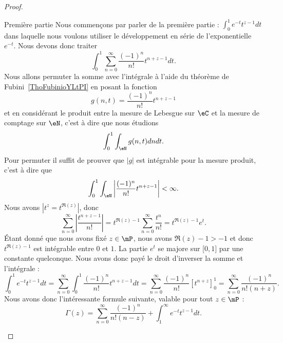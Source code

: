 \begin{proof}
\begin{subproof}
        \item[Première partie] Nous commençons par parler de la première partie : \( \int_0^1 e^{-t}t^{z-1}dt\) dans laquelle nous voulons utiliser le développement en série de l'exponentielle \(  e^{-t}\). Nous devons donc traiter
            \begin{equation}
                \int_0^1\sum_{n=0}^{\infty}\frac{ (-1)^n }{ n! }t^{n+z-1}dt.
            \end{equation}
            Nous allons permuter la somme avec l'intégrale à l'aide du théorème de Fubini~\ref{ThoFubinioYLtPI} en posant la fonction
            \begin{equation}
                g(n,t)=\frac{ (-1)^n }{ n! }t^{n+z-1}
            \end{equation}
            et en considérant le produit entre la mesure de Lebesgue sur \( \eC\) et la mesure de comptage sur \( \eN\), c'est à dire que nous étudions
            \begin{equation}
                \int_0^1\int_{\eN}g(n,t)dndt.
            \end{equation}
            Pour permuter il suffit de prouver que \( | g |\) est intégrable pour la mesure produit, c'est à dire que
            \begin{equation}
                \int_0^1\int_{\eN}\left| \frac{ (-1)^n }{ n! }t^{n+z-1} \right| <\infty.
            \end{equation}
            Nous avons \( | t^z=t^{\Re(z)} |\), donc
            \begin{equation}
                \sum_{n=0}^{\infty}\left| \frac{ t^{n+z-1} }{ n! } \right| =t^{\Re(z)-1}\sum_{n=0}^{\infty}\frac{ t^n }{ n! }=t^{\Re(z)-1} e^{t}.
            \end{equation}
            Étant donné que nous avons fixé \( z\in\mP\), nous avons \( \Re(z)-1>-1\) et donc \( t^{\Re(z)-1}\) est intégrable entre \( 0\) et \( 1\).
            La partie \(  e^{t}\) se majore sur \( \mathopen[ 0 , 1 \mathclose]\) par une constante quelconque. Nous avons donc payé le droit d'inverser la somme et l'intégrale :
            \begin{equation}
                \int_0^1 e^{-t}t^{z-1}dt=\sum_{n=0}^{\infty}\int_0^1\frac{ (-1)^n }{ n! }t^{n+z-1}dt=\sum_{n=0}^{\infty}\frac{ (-1)^n }{ n! }[t^{n+z}]_0^1=\sum_{n=0}^{\infty}\frac{ (-1)^n }{ n!(n+z) }.
            \end{equation}
            Nous avons donc l'intéressante formule suivante, valable pour tout \( z\in\mP\) :
            \begin{equation}
                \Gamma(z)=\sum_{n=0}^{\infty}\frac{ (-1)^n }{ n!(n-z) }+\int_1^{\infty} e^{-t}t^{z-1}dt.
            \end{equation}


\end{subproof}
\end{proof}
